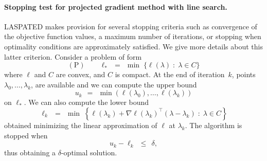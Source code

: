 \documentclass[article]{jss}
\begin{document}
\paragraph{Stopping test for projected gradient method with line search.}
LASPATED makes provision for several stopping criteria such as convergence of the objective function values, a maximum number of iterations, or stopping when optimality conditions are approximately satisfied.
We give more details about this latter criterion.
Consider a problem of form
\[
(\mbox{P}) \qquad \ell_{*} \ \ = \ \ \min \; \{\ell(\lambda) \; : \; \lambda \in C\}
\]
where $\ell$ and $C$ are convex, and $C$ is compact.
At the end of iteration~$k$, points $\lambda_{0},\ldots,\lambda_{k}$, are available
and we can compute the upper bound
\begin{equation}
\label{uppbd}
u_{k} \ \ = \ \ \min(\ell(\lambda_{0}),\ldots,\ell(\lambda_{k}))
\end{equation}
on $\ell_{*}$.
We can also compute the lower bound
\begin{equation}
\label{lowbd}
\ell_{k} \ \ = \ \ \min \; \left\{\ell(\lambda_{k}) + \nabla \ell(\lambda_{k})^{\top} (\lambda - \lambda_{k}) \; : \; \lambda \in C\right\}
\end{equation}
obtained minimizing the linear approximation of $\ell$ at $\lambda_{k}$.
The algorithm is stopped when
\begin{equation}
u_{k} - \ell_{k} \ \ \leq \ \ \delta,
\end{equation}
thus obtaining a $\delta$-optimal solution.
\end{document}
